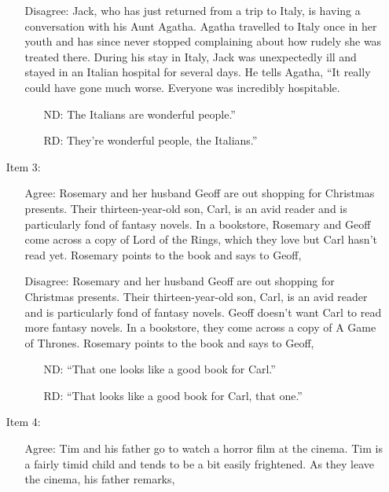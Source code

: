 \documentclass[titlepage,12pt]{article}
\begin{document}
\begin{appendices}
\begin{enumerate}
\begin{enumerate}
        \item [Disagree:] Jack, who has just returned from a trip to Italy, is having a conversation with his Aunt Agatha. Agatha travelled to Italy once in her youth and has since never stopped complaining about how rudely she was treated there. During his stay in Italy, Jack was unexpectedly ill and stayed in an Italian hospital for several days. He tells Agatha, ``It really could have gone much worse. Everyone was incredibly hospitable.
        \begin{itemize}
        \setlength{\itemindent}{5em}
            \item [ND:] The Italians are wonderful people.''
            \item [RD:] They're wonderful people, the Italians.''
        \end{itemize}
    \end{enumerate}
        \item[Item 3:]\hfill 
        \begin{enumerate}
        \item [Agree:] Rosemary and her husband Geoff are out shopping for Christmas presents. Their thirteen-year-old son, Carl, is an avid reader and is particularly fond of fantasy novels. In a bookstore, Rosemary and Geoff come across a copy of Lord of the Rings, which they love but Carl hasn't read yet. Rosemary points to the book and says to Geoff,
        \item [Disagree:] Rosemary and her husband Geoff are out shopping for Christmas presents. Their thirteen-year-old son, Carl, is an avid reader and is particularly fond of fantasy novels. Geoff doesn't want Carl to read more fantasy novels. In a bookstore, they come across a copy of A Game of Thrones. Rosemary points to the book and says to Geoff,
        \begin{itemize}
        \setlength{\itemindent}{5em}
            \item [ND:] ``That one looks like a good book for Carl.''
            \item [RD:] ``That looks like a good book for Carl, that one.''
        \end{itemize}
    \end{enumerate}
    \item[Item 4:] \hfill 
    \begin{enumerate}
        \item [Agree:] Tim and his father go to watch a horror film at the cinema. Tim is a fairly timid child and tends to be a bit easily frightened. As they leave the cinema, his father remarks,

\end{enumerate}
\end{enumerate}
\end{appendices}
\end{document}
